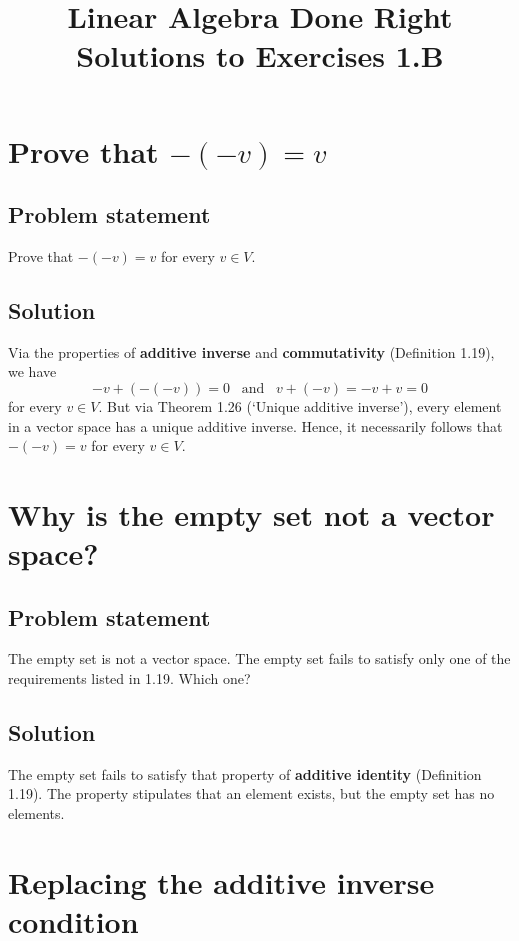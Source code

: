 \documentclass{article}
\title{Linear Algebra Done Right\\Solutions to Exercises 1.B}
\author{}
\date{}
\begin{document}
\maketitle

\section{Prove that $-(-v)=v$}
\subsection*{Problem statement}
Prove that $-(-v)=v$ for every $v\in V$.

\subsection*{Solution}
Via the properties of \textbf{additive inverse} and \textbf{commutativity} (Definition 1.19), we have
\[-v+(-(-v))=0\;\;\;\text{and}\;\;\;v+(-v)=-v+v=0\]
for every $v\in V$.
But via Theorem 1.26 (`Unique additive inverse'), every element in a vector space has a unique additive inverse. 
Hence, it necessarily follows that $-(-v)=v$ for every $v\in V$.

\clearpage

\renewcommand{\thesection}{4}
\section{Why is the empty set not a vector space?}
\subsection*{Problem statement}
The empty set is not a vector space. 
The empty set fails to satisfy only one of the requirements listed in 1.19. 
Which one?

\subsection*{Solution}
The empty set fails to satisfy that property of \textbf{additive identity} (Definition 1.19). 
The property stipulates that an element exists, but the empty set has no elements.

\clearpage

\renewcommand{\thesection}{5}
\section{Replacing the additive inverse condition}
\end{document}
